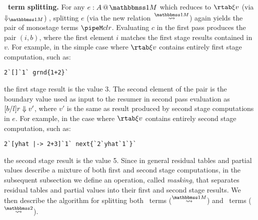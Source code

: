 \begin{abstrsyn}


\textbf{\bbonem\ term splitting.}  For any $\colmix e A$ which reduces
to $\rtab \xi v$ (via $\redonesym$) , splitting $e$ (via the new
relation~$\splitonesym$) again yields the pair of monostage terms
$\pipeM c l r$. Evaluating $c$ in the first pass produces the pair
$(i,b)$, where the first element $i$ matches the first stage results
contained in $v$.  For example, in the simple case where $\rtab \xi v$
contains entirely first stage computation, such as:
\begin{lstlisting}
2`[]`1` grnd{1+2}`
\end{lstlisting}
the first stage result is the value 3.  The second element of the pair
is the boundary value used as input to the resumer in second pass
evaluation as ${[b/l]r} \Downarrow {v'}$, where $v'$ is the same as
result produced by second stage computations in $e$.  For example, in
the case where $\rtab \xi v$ contains entirely second stage
computation, such as:
\begin{lstlisting}
2`[yhat |-> 2+3]`1` next{`2`yhat`1`}`
\end{lstlisting}
the second stage result is the value 5. Since in general residual
tables and partial values describe a mixture of both first and second
stage computations, in the subsequent subsection we define an
operation, called {\em masking}, that separates residual tables and
partial values into their first and second stage results. We then
describe the algorithm for splitting both \bbonem\ terms
($\splitonesym$) and \bbtwo\ terms ($\splittwosym$).





\end{abstrsyn}
